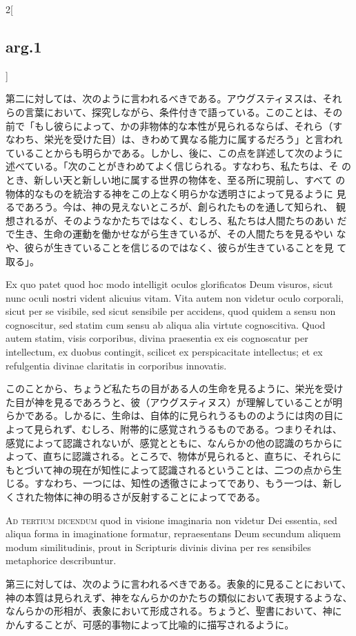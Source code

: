 \documentclass[paper=a4paper,fontsize=10pt,jafontsize=9pt,titlepage]{jlreq}
\begin{document}
\begin{paracol}{2}[\subsection{arg.1}]
\switchcolumn

第二に対しては、次のように言われるべきである。アウグスティヌスは、それ
らの言葉において、探究しながら、条件付きで語っている。このことは、その
前で「もし彼らによって、かの非物体的な本性が見られるならば、それら（す
なわち、栄光を受けた目）は、きわめて異なる能力に属するだろう」と言われ
ていることからも明らかである。しかし、後に、この点を詳述して次のように
述べている。「次のことがきわめてよく信じられる。すなわち、私たちは、そ
のとき、新しい天と新しい地に属する世界の物体を、至る所に現前し、すべて
の物体的なものを統治する神をこの上なく明らかな透明さによって見るように
見るであろう。今は、神の見えないところが、創られたものを通して知られ、
観想されるが、そのようなかたちではなく、むしろ、私たちは人間たちのあい
だで生き、生命の運動を働かせながら生きているが、その人間たちを見るやい
なや、彼らが生きていることを信じるのではなく、彼らが生きていることを見
て取る」。

\switchcolumn*

Ex quo patet quod hoc modo intelligit oculos glorificatos Deum
visuros, sicut nunc oculi nostri vident alicuius vitam. Vita autem non
videtur oculo corporali, sicut per se visibile, sed sicut sensibile
per accidens, quod quidem a sensu non cognoscitur, sed statim cum
sensu ab aliqua alia virtute cognoscitiva. Quod autem statim, visis
corporibus, divina praesentia ex eis cognoscatur per intellectum, ex
duobus contingit, scilicet ex perspicacitate intellectus; et ex
refulgentia divinae claritatis in corporibus innovatis.

\switchcolumn

このことから、ちょうど私たちの目がある人の生命を見るように、栄光を受け
た目が神を見るであろうと、彼（アウグスティヌス）が理解していることが明
らかである。しかるに、生命は、自体的に見られうるもののようには肉の目に
よって見られず、むしろ、附帯的に感覚されうるものである。つまりそれは、
感覚によって認識されないが、感覚とともに、なんらかの他の認識のちからに
よって、直ちに認識される。ところで、物体が見られると、直ちに、それらに
もとづいて神の現在が知性によって認識されるということは、二つの点から生
じる。すなわち、一つには、知性の透徹さによってであり、もう一つは、新し
くされた物体に神の明るさが反射することによってである。

\switchcolumn*[\subsection{ad.3}]

{\scshape Ad tertium dicendum} quod in visione imaginaria non videtur Dei
essentia, sed aliqua forma in imaginatione formatur, repraesentans
Deum secundum aliquem modum similitudinis, prout in Scripturis divinis
divina per res sensibiles metaphorice describuntur.

\switchcolumn

第三に対しては、次のように言われるべきである。表象的に見ることにおいて、
神の本質は見られえず、神をなんらかのかたちの類似において表現するような、
なんらかの形相が、表象において形成される。ちょうど、聖書において、神に
かんすることが、可感的事物によって比喩的に描写されるように。

\end{paracol}
\end{document}
